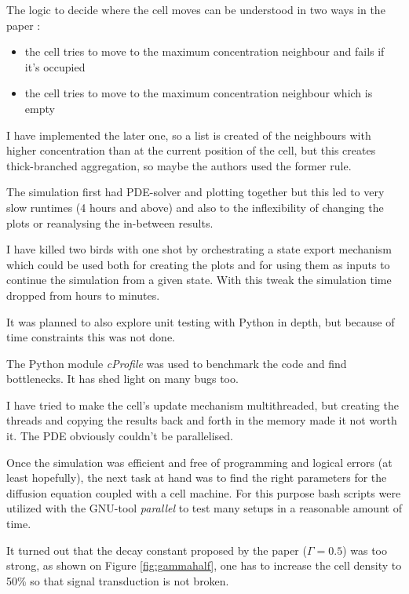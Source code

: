 \documentclass[a4paper,12pt]{article}
\begin{document}
The logic to decide where the cell moves can be understood in two ways in the paper \cite{kessler1993}:
\begin{itemize}
 \item the cell tries to move to the maximum concentration neighbour and fails if it's occupied
 \item the cell tries to move to the maximum concentration neighbour which is empty
\end{itemize}

I have implemented the later one, so a list is created of the neighbours with higher concentration than at the current position of the cell, but this creates thick-branched aggregation, so maybe the authors used the former rule.

The simulation first had PDE-solver and plotting together but this led to very slow runtimes (4 hours and above) and also to the inflexibility of changing the plots or reanalysing the in-between results. 

I have killed two birds with one shot by orchestrating a state export mechanism which could be used both for creating the plots and for using them as inputs to continue the simulation from a given state. With this tweak the simulation time dropped from hours to minutes.

It was planned to also explore unit testing with Python in depth, but because of time constraints this was not done.

The Python module \emph{cProfile} was used to benchmark the code and find bottlenecks. It has shed light on many bugs too.

I have tried to make the cell's update mechanism multithreaded, but creating the threads and copying the results back and forth in the memory made it not worth it. The PDE obviously couldn't be parallelised.

Once the simulation was efficient and free of programming and logical errors (at least hopefully), the next task at hand was to find the right parameters for the diffusion equation coupled with a cell machine. For this purpose bash scripts were utilized with the GNU-tool \emph{parallel} to test many setups in a reasonable amount of time.

It turned out that the decay constant proposed by the \cite{kessler1993} paper ($\Gamma = 0.5$) was too strong, as shown on Figure \ref{fig:gammahalf}, one has to increase the cell density to 50\% so that signal transduction is not broken.
\end{document}
